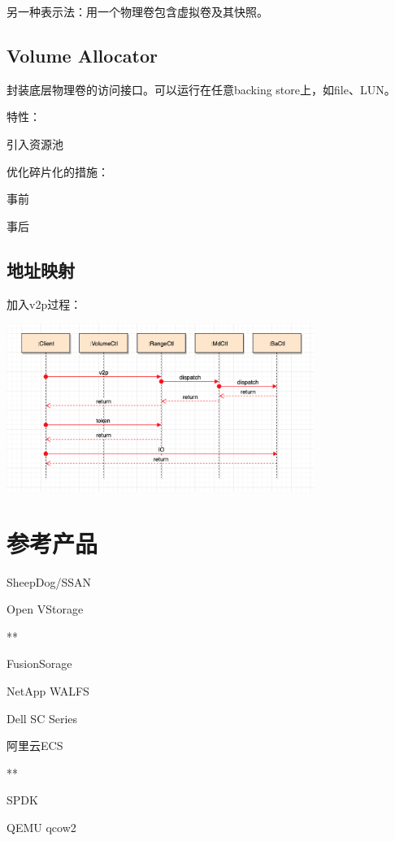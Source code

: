另一种表示法：用一个物理卷包含虚拟卷及其快照。

\subsection{Volume Allocator}

封装底层物理卷的访问接口。可以运行在任意backing store上，如file、LUN。

特性：
\begin{enumbox}
\item 引入资源池
\end{enumbox}

优化碎片化的措施：
\begin{enumbox}
\item 事前
\item 事后
\end{enumbox}

\subsection{地址映射}

加入v2p过程：
\begin{center}
\includegraphics[width=10cm]{../imgs/data-path.png}
\end{center}

\section{参考产品}

\begin{enumbox}
\item SheepDog/SSAN
\item Open VStorage
\item ***
\item FusionSorage
\item NetApp WALFS
\item Dell SC Series
\item 阿里云ECS
\item ***
\item SPDK
\item QEMU qcow2
\end{enumbox}
